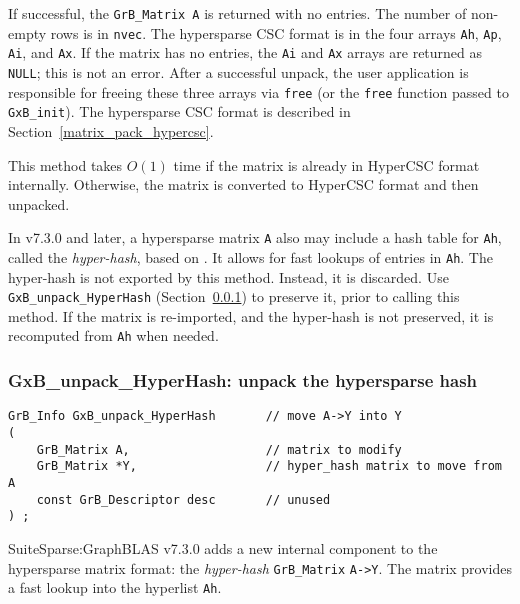 \documentclass[12pt]{article}
\begin{document}
If successful, the \verb'GrB_Matrix A' is
returned with no entries.
The number of non-empty
rows is in \verb'nvec'.  The hypersparse CSC format is in the four arrays
\verb'Ah', \verb'Ap', \verb'Ai', and \verb'Ax'.  If the matrix has no entries,
the \verb'Ai' and \verb'Ax' arrays are returned as \verb'NULL'; this is not an
error.  After a successful unpack, the user application is responsible for
freeing these three arrays via \verb'free' (or the \verb'free' function passed
to \verb'GxB_init').  The hypersparse CSC format is described in
Section~\ref{matrix_pack_hypercsc}.

This method takes $O(1)$ time if the matrix is already in HyperCSC format
internally.  Otherwise, the matrix is converted to HyperCSC format and then
unpacked.

In v7.3.0 and later, a hypersparse matrix \verb'A' also may include a hash
table for \verb'Ah', called the {\em hyper-hash}, based on \cite{Green19}.  It
allows for fast lookups of entries in \verb'Ah'.  The hyper-hash is not
exported by this method.  Instead, it is discarded.  Use
\verb'GxB_unpack_HyperHash' (Section~\ref{unpack_hyperhash}) to preserve it,
prior to calling this method.  If the matrix is re-imported, and the hyper-hash
is not preserved, it is recomputed from \verb'Ah' when needed.

\newpage
\subsubsection{{\sf GxB\_unpack\_HyperHash:} unpack the hypersparse hash}
\label{unpack_hyperhash}

\begin{mdframed}[userdefinedwidth=6in]
{\footnotesize
\begin{verbatim}
GrB_Info GxB_unpack_HyperHash       // move A->Y into Y
(
    GrB_Matrix A,                   // matrix to modify
    GrB_Matrix *Y,                  // hyper_hash matrix to move from A
    const GrB_Descriptor desc       // unused
) ;
\end{verbatim}
} \end{mdframed}


SuiteSparse:GraphBLAS v7.3.0 adds a new internal component to the
hypersparse matrix format: the {\em hyper-hash} \verb'GrB_Matrix' \verb'A->Y'.
The matrix provides a fast lookup into the hyperlist \verb'Ah'.
\end{document}
